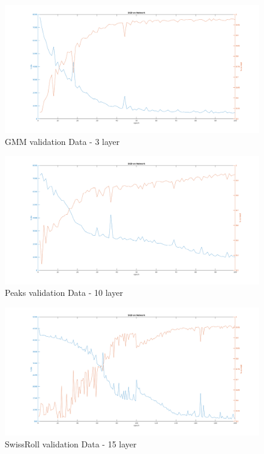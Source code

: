 \documentclass{article}
\numberwithin{equation}{section}
\begin{document}
\begin{figure}[h!]
  \caption{GMM validation Data - 3 layer}
  \includegraphics[width=\textwidth]{network_gmm_3layers.png}
\end{figure}

\begin{figure}[h!]
  \caption{Peaks validation Data - 10 layer}
  \includegraphics[width=\textwidth]{network_peaks_10layers.png}
\end{figure}

\begin{figure}[h!]
  \caption{SwissRoll validation Data - 15 layer}
  \includegraphics[width=\textwidth]{network_swissroll_15layers.png}
\end{figure}
\end{document}
